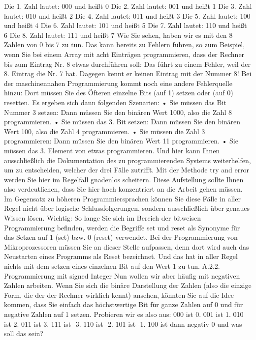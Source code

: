 Die 1. Zahl lautet:	000	und heißt 0
Die 2. Zahl lautet:	001	und heißt 1
Die 3. Zahl lautet:	010	und heißt 2
Die 4. Zahl lautet:	011	und heißt 3
Die 5. Zahl lautet:	100 	und heißt 4
Die 6. Zahl lautet:	101 	und heißt 5
Die 7. Zahl lautet:	110 	und heißt 6
Die 8. Zahl lautet:	111 	und heißt 7
Wie Sie sehen, haben wir es mit den 8 Zahlen von 0 bis 7 zu tun. Das kann bereits zu Fehlern führen, so zum Beispiel, wenn Sie bei einem Array mit acht Einträgen programmieren, dass der Rechner bis zum Eintrag Nr. 8 etwas durchführen soll: Das führt zu einem Fehler, weil der 8. Eintrag die Nr. 7 hat. Dagegen kennt er keinen Eintrag mit der Nummer 8!
Bei der maschinennahen Programmierung kommt noch eine andere Fehlerquelle hinzu: Dort müssen Sie des Öfteren einzelne Bits (auf 1) setzen oder (auf 0) resetten. Es ergeben sich dann folgenden Szenarien:
•	Sie müssen das Bit Nummer 3 setzen: Dann müssen Sie den binären Wert 1000, also die Zahl 8 programmieren.
•	Sie müssen das 3. Bit setzen: Dann müssen Sie den binären Wert 100, also die Zahl 4 programmieren.
•	Sie müssen die Zahl 3 programmieren: Dann müssen Sie den binären Wert 11 programmieren.
•	Sie müssen das 3. Element von etwas programmieren. Und hier kann Ihnen ausschließlich die Dokumentation des zu programmierenden Systems weiterhelfen, um zu entscheiden, welcher der drei Fälle zutrifft. Mit der Methode try and error werden Sie hier im Regelfall gnadenlos scheitern.
Diese Aufstellung sollte Ihnen also verdeutlichen, dass Sie hier hoch konzentriert an die Arbeit gehen müssen. Im Gegensatz zu höheren Programmiersprachen können Sie diese Fälle in aller Regel nicht über logische Schlussfolgerungen, sondern ausschließlich über genaues Wissen lösen.
Wichtig: So lange Sie sich im Bereich der bitweisen Programmierung befinden, werden die Begriffe set und reset als Synonyme für das Setzen auf 1 (set) bzw. 0 (reset) verwendet. Bei der Programmierung von Mikroprozessoren müssen Sie an dieser Stelle aufpassen, denn dort wird auch das Neustarten eines Programms als Reset bezeichnet. Und das hat in aller Regel nichts mit dem setzen eines einzelnen Bit auf den Wert 1 zu tun.
A.2.2. Programmierung mit signed Integer
Nun wollen wir aber häufig mit negativen Zahlen arbeiten. Wenn Sie sich die binäre Darstellung der Zahlen (also die einzige Form, die der der Rechner wirklich kennt) ansehen, könnten Sie auf die Idee kommen, dass Sie einfach das höchstwertige Bit für ganze Zahlen auf 0 und für negative Zahlen auf 1 setzen. Probieren wir es also aus:
000	ist 0.
001	ist 1.
010	ist 2.
011	ist 3.
111	ist -3.
110	ist -2.
101	ist -1.
100	ist dann negativ 0 und was soll das sein?
